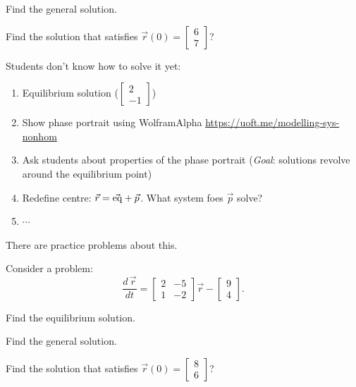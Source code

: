 \begin{parts}
	\item Find the general solution.
	\item Find the solution that satisfies $\vec{r}(0) = \begin{bmatrix} 6 \\ 7\end{bmatrix}$?
\end{parts}



\bookonlynewpage

\begin{annotation}
	\begin{goals}
		
		Students don't know how to solve it yet:
		\begin{enumerate}
			\item Equilibrium solution ($\begin{bmatrix}2\\-1\end{bmatrix}$)
			\item Show phase portrait using WolframAlpha \url{https://uoft.me/modelling-sys-nonhom}
			\item Ask students about properties of the phase portrait (\emph{Goal}: solutions revolve around the equilibrium point)
			\item Redefine centre: $\vec{r} = \vec{\rm eq} + \vec{p}$. What system foes $\vec{p}$ solve?
			\item $\cdots$
		\end{enumerate}
		
		There are practice problems about this.
	\end{goals}
\end{annotation}
\question
Consider a problem:
$$
\frac{d \,\vec{r}}{dt} = \begin{bmatrix} 2 & -5 \\ 1 & -2\end{bmatrix} \vec{r} - \begin{bmatrix} 9 \\ 4 \end{bmatrix}.
$$
\begin{parts}
	\item Find the equilibrium solution.
	\item Find the general solution.
	\item Find the solution that satisfies $\vec{r}(0) = \begin{bmatrix} 8 \\ 6 \end{bmatrix}$?
\end{parts}


